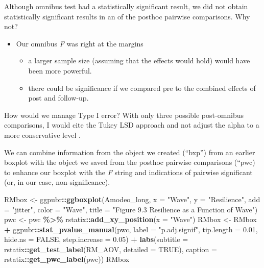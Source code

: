 \documentclass[
  11pt,
]{book}
\newenvironment{Shaded}{\begin{snugshade}}{\end{snugshade}}
\newcommand{\AttributeTok}[1]{\textcolor[rgb]{0.27,0.27,0.27}{#1}}
\newcommand{\ConstantTok}[1]{\textcolor[rgb]{0.37,0.37,0.37}{#1}}
\newcommand{\FloatTok}[1]{\textcolor[rgb]{0.06,0.06,0.06}{#1}}
\newcommand{\FunctionTok}[1]{\textcolor[rgb]{0.27,0.27,0.27}{\textbf{#1}}}
\newcommand{\NormalTok}[1]{#1}
\newcommand{\OtherTok}[1]{\textcolor[rgb]{0.37,0.37,0.37}{#1}}
\newcommand{\SpecialCharTok}[1]{\textcolor[rgb]{0.43,0.43,0.43}{\textbf{#1}}}
\newcommand{\StringTok}[1]{\textcolor[rgb]{0.5,0.5,0.5}{#1}}
\providecommand{\tightlist}{%
  \setlength{\itemsep}{0pt}\setlength{\parskip}{0pt}}
\begin{document}
Although omnibus test had a statistically significant result, we did not obtain statistically significant results in an of the posthoc pairwise comparisons. Why not?

\begin{itemize}
\tightlist
\item
  Our omnibus \emph{F} was right at the margins

  \begin{itemize}
  \tightlist
  \item
    a larger sample size (assuming that the effects would hold) would have been more powerful.
  \item
    there could be significance if we compared pre to the combined effects of post and follow-up.
  \end{itemize}
\end{itemize}

How would we manage Type I error? With only three possible post-omnibus comparisons, I would cite the Tukey LSD approach and not adjust the alpha to a more conservative level \citep{green_using_2017}.

We can combine information from the object we created (``bxp'') from an earlier boxplot with the object we saved from the posthoc pairwise comparisons (``pwc) to enhance our boxplot with the \emph{F} string and indications of pairwise significant (or, in our case, non-significance).

\begin{Shaded}
\begin{Highlighting}[]
\NormalTok{RMbox }\OtherTok{\textless{}{-}}\NormalTok{ ggpubr}\SpecialCharTok{::}\FunctionTok{ggboxplot}\NormalTok{(Amodeo\_long, }\AttributeTok{x =} \StringTok{"Wave"}\NormalTok{, }\AttributeTok{y =} \StringTok{"Resilience"}\NormalTok{, }\AttributeTok{add =} \StringTok{"jitter"}\NormalTok{,}
    \AttributeTok{color =} \StringTok{"Wave"}\NormalTok{, }\AttributeTok{title =} \StringTok{"Figure 9.3 Resilience as a Function of Wave"}\NormalTok{)}
\NormalTok{pwc }\OtherTok{\textless{}{-}}\NormalTok{ pwc }\SpecialCharTok{\%\textgreater{}\%}
\NormalTok{    rstatix}\SpecialCharTok{::}\FunctionTok{add\_xy\_position}\NormalTok{(}\AttributeTok{x =} \StringTok{"Wave"}\NormalTok{)}
\NormalTok{RMbox }\OtherTok{\textless{}{-}}\NormalTok{ RMbox }\SpecialCharTok{+}\NormalTok{ ggpubr}\SpecialCharTok{::}\FunctionTok{stat\_pvalue\_manual}\NormalTok{(pwc, }\AttributeTok{label =} \StringTok{"p.adj.signif"}\NormalTok{,}
    \AttributeTok{tip.length =} \FloatTok{0.01}\NormalTok{, }\AttributeTok{hide.ns =} \ConstantTok{FALSE}\NormalTok{, }\AttributeTok{step.increase =} \FloatTok{0.05}\NormalTok{) }\SpecialCharTok{+} \FunctionTok{labs}\NormalTok{(}\AttributeTok{subtitle =}\NormalTok{ rstatix}\SpecialCharTok{::}\FunctionTok{get\_test\_label}\NormalTok{(RM\_AOV,}
    \AttributeTok{detailed =} \ConstantTok{TRUE}\NormalTok{), }\AttributeTok{caption =}\NormalTok{ rstatix}\SpecialCharTok{::}\FunctionTok{get\_pwc\_label}\NormalTok{(pwc))}
\NormalTok{RMbox}
\end{Highlighting}
\end{Shaded}
\end{document}
